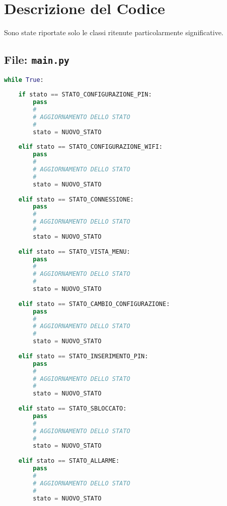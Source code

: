 \documentclass[12pt,a4paper]{article}
\begin{document}
	\section{Descrizione del Codice}
	Sono state riportate solo le classi ritenute particolarmente significative.
	
	\subsection{File: \texttt{main.py}}
	\begin{lstlisting}[language=Python, caption={Il main del programma è stato sviluppato come un automa a stati a finiti e qui sono rappresentati i vari stati. Lo stato di configurazione pin è lo stato che viene eseguito alla prima esecuzione del programma: qui viene configurato il file contenente il pin d'accesso al caveaux. Lo stato di configurazione wifi è eseguito sequenzialmente a quello di configurazione pin. Lo stato di connessione permette la connessione all'MQTT. Finiti i vari step di connessione si accede allo stato di vista menu, in cui vengono riportati parametri interni al caveaux, quali temperatura e umidità, ed è inoltre possibile scegliere di accedere al caveaux o di cambiare configurazione. Entrambe le opzioni appena descritte vengono eseguite in appositi stati: stato di inserimento pin e stato di cambio configurazione. Una volta sbloccato il caveaux si entra nello stato sbloccato. In caso di intrusione o valori di temperatura e umidità fuori norma si entra nello stato di allarme.}]
while True:
		
	if stato == STATO_CONFIGURAZIONE_PIN:
		pass
		#
		# AGGIORNAMENTO DELLO STATO
		#
		stato = NUOVO_STATO
		
	elif stato == STATO_CONFIGURAZIONE_WIFI:
		pass
		#
		# AGGIORNAMENTO DELLO STATO
		#
		stato = NUOVO_STATO
		
	elif stato == STATO_CONNESSIONE:
		pass
		#
		# AGGIORNAMENTO DELLO STATO
		#
		stato = NUOVO_STATO
		
	elif stato == STATO_VISTA_MENU:
		pass
		#
		# AGGIORNAMENTO DELLO STATO
		#
		stato = NUOVO_STATO
		
	elif stato == STATO_CAMBIO_CONFIGURAZIONE:
		pass
		#
		# AGGIORNAMENTO DELLO STATO
		#
		stato = NUOVO_STATO
		
	elif stato == STATO_INSERIMENTO_PIN:
		pass
		#
		# AGGIORNAMENTO DELLO STATO
		#
		stato = NUOVO_STATO
		
	elif stato == STATO_SBLOCCATO:
		pass
		#
		# AGGIORNAMENTO DELLO STATO
		#
		stato = NUOVO_STATO
		
	elif stato == STATO_ALLARME:
		pass
		#
		# AGGIORNAMENTO DELLO STATO
		#
		stato = NUOVO_STATO
	\end{lstlisting}
	
\end{document}
